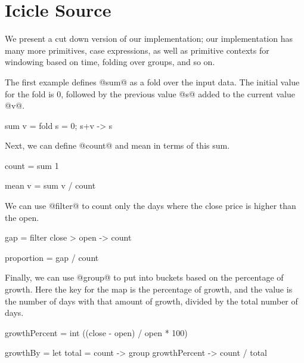 \section{Icicle Source}
\label{s:Source}

We present a cut down version of our implementation; our implementation has many more primitives, case expressions, as well as primitive contexts for windowing based on time, folding over groups, and so on.

The first example defines @sum@ as a fold over the input data.
The initial value for the fold is $0$, followed by the previous value @s@ added to the current value @v@.
\begin{code}
sum v
 =  fold s = 0; s+v
 -> s
\end{code}

Next, we can define @count@ and mean in terms of this sum.
\begin{code}
count
 =  sum 1

mean v
 =  sum v / count
\end{code}

We can use @filter@ to count only the days where the close price is higher than the open.
\begin{code}
gap
 =  filter close > open
 -> count

proportion
 =  gap / count
\end{code}

Finally, we can use @group@ to put into buckets based on the percentage of growth.
Here the key for the map is the percentage of growth, and the value is the number of days with that amount of growth, divided by the total number of days.
\begin{code}
growthPercent
 =  int ((close - open) / open * 100)

growthBy
 =  let total = count
 -> group growthPercent
 -> count / total
\end{code}





